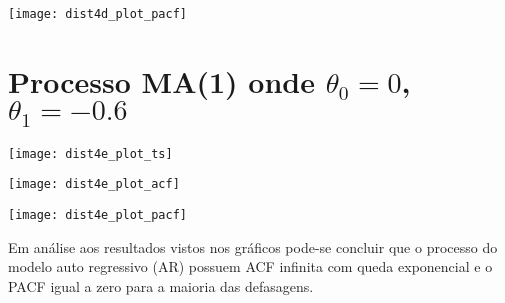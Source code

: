 \begin{center}
\begin{centering}
\texttt{[image: dist4d\_plot\_pacf]}
\par\end{centering}
\par\end{center}

\section{Processo MA(1) onde $\theta_{0}=0$, $\theta_{1}=-0.6$}

\begin{center}
\begin{centering}
\texttt{[image: dist4e\_plot\_ts]}
\par\end{centering}
\par\end{center}


\begin{center}
\begin{centering}
\texttt{[image: dist4e\_plot\_acf]}
\par\end{centering}
\par\end{center}

\begin{center}
\begin{centering}
\texttt{[image: dist4e\_plot\_pacf]}
\par\end{centering}
\par\end{center}

Em análise aos resultados vistos nos gráficos pode-se concluir que o processo do modelo auto regressivo (AR) possuem ACF  infinita com queda exponencial e o PACF igual a zero para a maioria das defasagens.
